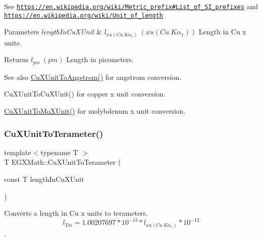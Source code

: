 See \href{https://en.wikipedia.org/wiki/Metric_prefix#List_of_SI_prefixes}{\tt https\+://en.\+wikipedia.\+org/wiki/\+Metric\+\_\+prefix\#\+List\+\_\+of\+\_\+\+S\+I\+\_\+prefixes} and \href{https://en.wikipedia.org/wiki/Unit_of_length}{\tt https\+://en.\+wikipedia.\+org/wiki/\+Unit\+\_\+of\+\_\+length} 
\begin{DoxyParams}{Parameters}
{\em length\+In\+Cu\+X\+Unit} & $ l_{xu(Cu\ K\alpha_1)}\ (xu(Cu\ K\alpha_1))$ Length in Cu x units. \\
\hline
\end{DoxyParams}
\begin{DoxyReturn}{Returns}
$ l_{pm}\ (pm)$ Length in picometers. 
\end{DoxyReturn}
\begin{DoxySeeAlso}{See also}
\mbox{\hyperlink{group___e_g_x_math-_conversions-_length_conversions-_non-_s_i-_cu_x_unit-_non-_s_i_ga0ccb6fe91bb6437a1c41674613e2e395}{Cu\+X\+Unit\+To\+Angstrom()}} for angstrom conversion. 

Cu\+X\+Unit\+To\+Cu\+X\+Unit() for copper x unit conversion. 

\mbox{\hyperlink{group___e_g_x_math-_conversions-_length_conversions-_non-_s_i-_cu_x_unit-_non-_s_i_gad93f4b59cc8e8f052b3cf8cad7c7b173}{Cu\+X\+Unit\+To\+Mo\+X\+Unit()}} for molybdenum x unit conversion. 
\end{DoxySeeAlso}
\mbox{\label{group___e_g_x_math-_conversions-_length_conversions-_non-_s_i-_cu_x_unit-_s_i_gae67d5afb9164df2584c669f90ee16f9a}} 
\subsubsection{\texorpdfstring{Cu\+X\+Unit\+To\+Terameter()}{CuXUnitToTerameter()}}
{\footnotesize\ttfamily template$<$typename T $>$ \\
T E\+G\+X\+Math\+::\+Cu\+X\+Unit\+To\+Terameter (\begin{DoxyParamCaption}\item[{const T}]{length\+In\+Cu\+X\+Unit }\end{DoxyParamCaption})}



Converts a length in Cu x units to terameters. \[ l_{Tm}=1.00207697*10^{-13} * l_{xu(Cu\ K\alpha_1)} * 10^{-12} \]. 


